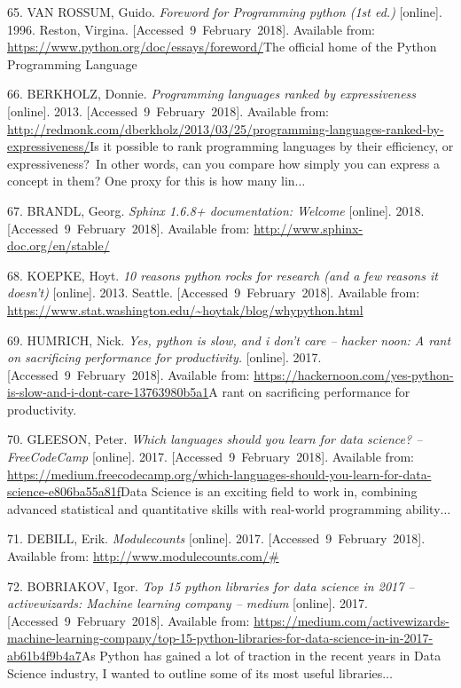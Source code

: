 \documentclass[american,a4paper,oneside,,tablecaptionabove]{scrbook}
\begin{document}
\hypertarget{ref-vanRossum.1996}{}
65. VAN ROSSUM, Guido. \emph{Foreword for Programming python (1st ed.)}
{[}online{]}. 1996. Reston, Virgina. {[}Accessed~9~February~2018{]}.
Available from: \url{https://www.python.org/doc/essays/foreword/}The
official home of the Python Programming Language

\hypertarget{ref-Berkholz.2013}{}
66. BERKHOLZ, Donnie. \emph{Programming languages ranked by
expressiveness} {[}online{]}. 2013. {[}Accessed~9~February~2018{]}.
Available from:
\url{http://redmonk.com/dberkholz/2013/03/25/programming-languages-ranked-by-expressiveness/}Is
it possible to rank programming languages by their efficiency, or
expressiveness?~In other words, can you compare how simply you can
express a concept in them? One proxy for this is how many lin\(\ldots\)

\hypertarget{ref-Brandl.2018}{}
67. BRANDL, Georg. \emph{Sphinx 1.6.8+ documentation: Welcome}
{[}online{]}. 2018. {[}Accessed~9~February~2018{]}. Available from:
\url{http://www.sphinx-doc.org/en/stable/}

\hypertarget{ref-Koepke.2013}{}
68. KOEPKE, Hoyt. \emph{10 reasons python rocks for research (and a few
reasons it doesn't)} {[}online{]}. 2013. Seattle.
{[}Accessed~9~February~2018{]}. Available from:
\url{https://www.stat.washington.edu/~hoytak/blog/whypython.html}

\hypertarget{ref-Humrich.2017}{}
69. HUMRICH, Nick. \emph{Yes, python is slow, and i don't care -- hacker
noon: A rant on sacrificing performance for productivity.} {[}online{]}.
2017. {[}Accessed~9~February~2018{]}. Available from:
\url{https://hackernoon.com/yes-python-is-slow-and-i-dont-care-13763980b5a1}A
rant on sacrificing performance for productivity.

\hypertarget{ref-Gleeson.2017}{}
70. GLEESON, Peter. \emph{Which languages should you learn for data
science? -- FreeCodeCamp} {[}online{]}. 2017.
{[}Accessed~9~February~2018{]}. Available from:
\url{https://medium.freecodecamp.org/which-languages-should-you-learn-for-data-science-e806ba55a81f}Data
Science is an exciting field to work in, combining advanced statistical
and quantitative skills with real-world programming ability\(\ldots\)

\hypertarget{ref-DeBill.2017}{}
71. DEBILL, Erik. \emph{Modulecounts} {[}online{]}. 2017.
{[}Accessed~9~February~2018{]}. Available from:
\url{http://www.modulecounts.com/\#}

\hypertarget{ref-Bobriakov.2017}{}
72. BOBRIAKOV, Igor. \emph{Top 15 python libraries for data science in
2017 -- activewizards: Machine learning company -- medium} {[}online{]}.
2017. {[}Accessed~9~February~2018{]}. Available from:
\url{https://medium.com/activewizards-machine-learning-company/top-15-python-libraries-for-data-science-in-in-2017-ab61b4f9b4a7}As
Python has gained a lot of traction in the recent years in Data Science
industry, I wanted to outline some of its most useful
libraries\(\ldots\)
\end{document}
